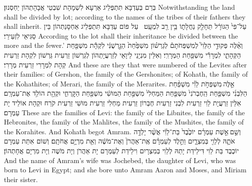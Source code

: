 {בְּרַם בְּעַדְבָּא תִּתְפְּלֵיג אַרְעָא לִשְׁמָהָת שִׁבְטֵי אֲבָהָתְהוֹן יַחְסְנוּן׃}
{Notwithstanding the land shall be divided by lot; according to the names of the tribes of their fathers they shall inherit.}{}
{עַל־פִּי֙ הַגּוֹרָ֔ל תֵּחָלֵ֖ק נַחֲלָת֑וֹ בֵּ֥ין רַ֖ב לִמְעָֽט׃ \setuma 
{}}
{עַל פּוֹם עַדְבָּא תִּתְפְּלֵיג אַחְסָנַתְהוֹן בֵּין סַגִּיאֵי לִזְעֵירֵי׃}
{According to the lot shall their inheritance be divided between the more and the fewer.’}{}
{וְאֵ֨לֶּה פְקוּדֵ֣י הַלֵּוִי֮ לְמִשְׁפְּחֹתָם֒ לְגֵרְשׁ֗וֹן מִשְׁפַּ֙חַת֙ הַגֵּ֣רְשֻׁנִּ֔י לִקְהָ֕ת מִשְׁפַּ֖חַת הַקְּהָתִ֑י לִמְרָרִ֕י מִשְׁפַּ֖חַת הַמְּרָרִֽי׃}
{וְאִלֵּין מִנְיָנֵי לֵיוָאֵי לְזַרְעֲיָתְהוֹן לְגֵרְשׁוֹן זַרְעִית גֵּרְשׁוֹן לִקְהָת זַרְעִית קְהָת לִמְרָרִי זַרְעִית מְרָרִי׃}
{And these are they that were numbered of the Levites after their families: of Gershon, the family of the Gershonites; of Kohath, the family of the Kohathites; of Merari, the family of the Merarites.}{}
{אֵ֣לֶּה \legarmeh  מִשְׁפְּחֹ֣ת לֵוִ֗י מִשְׁפַּ֨חַת הַלִּבְנִ֜י מִשְׁפַּ֤חַת הַֽחֶבְרֹנִי֙ מִשְׁפַּ֤חַת הַמַּחְלִי֙ מִשְׁפַּ֣חַת הַמּוּשִׁ֔י מִשְׁפַּ֖חַת הַקׇּרְחִ֑י וּקְהָ֖ת הוֹלִ֥ד אֶת־עַמְרָֽם׃
}
{אִלֵּין זַרְעֲיָת לֵוִי זַרְעִית לִבְנִי זַרְעִית חֶבְרוֹן זַרְעִית מַחְלִי זַרְעִית מוּשִׁי זַרְעִית קֹרַח וּקְהָת אוֹלֵיד יָת עַמְרָם׃}
{These are the families of Levi: the family of the Libnites, the family of the Hebronites, the family of the Mahlites, the family of the Mushites, the family of the Korahites. And Kohath begot Amram.}{}
{וְשֵׁ֣ם \legarmeh  אֵ֣שֶׁת עַמְרָ֗ם יוֹכֶ֙בֶד֙ בַּת־לֵוִ֔י אֲשֶׁ֨ר יָלְדָ֥ה אֹתָ֛הּ לְלֵוִ֖י בְּמִצְרָ֑יִם וַתֵּ֣לֶד לְעַמְרָ֗ם אֶֽת־אַהֲרֹן֙ וְאֶת־מֹשֶׁ֔ה וְאֵ֖ת מִרְיָ֥ם אֲחֹתָֽם׃
}
{וְשׁוֹם אִתַּת עַמְרָם יוֹכֶבֶד בַּת לֵוִי דִּילֵידַת יָתַהּ לְלֵוִי בְּמִצְרָיִם וִילֵידַת לְעַמְרָם יָת אַהֲרֹן וְיָת מֹשֶׁה וְיָת מִרְיָם אֲחָתְהוֹן׃}
{And the name of Amram’s wife was Jochebed, the daughter of Levi, who was born to Levi in Egypt; and she bore unto Amram Aaron and Moses, and Miriam their sister.}{}
